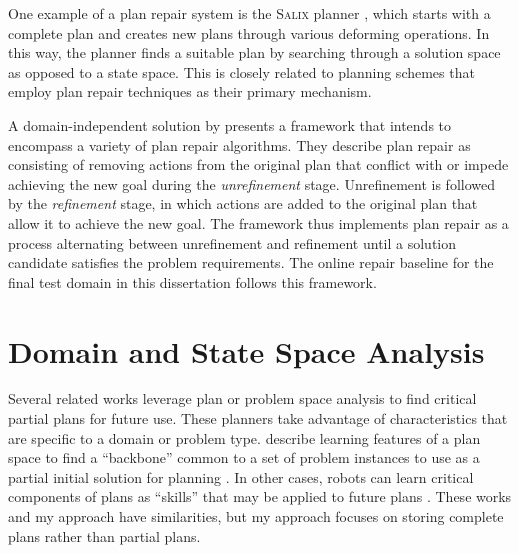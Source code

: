 One example of a plan repair system is the \textsc{Salix} planner \citep{logan97routeplanning}, which starts with a complete plan and creates new plans through various deforming operations.  In this way, the planner finds a suitable plan by searching through a solution space as opposed to a state space.  This is closely related to planning schemes that employ plan repair techniques as their primary mechanism.




A domain-independent solution by \cite{krogt05planrepair} presents a framework that intends to encompass a variety of plan repair algorithms.  They describe plan repair as consisting of removing actions from the original plan that conflict with or impede achieving the new goal during the \textit{unrefinement} stage.  Unrefinement is followed by the \textit{refinement} stage, in which actions are added to the original plan that allow it to achieve the new goal. The framework thus implements plan repair as a process alternating between  unrefinement and refinement until a  solution candidate satisfies the problem requirements.  The online repair baseline for the final test domain in this dissertation follows this framework.



\section{Domain and State Space Analysis}
\label{sec:state-space-analysis}

Several related works leverage plan or problem space analysis to find critical partial plans for future use. These planners take advantage of characteristics that are specific to a domain or problem type.  \citeauthor{bulka08useful}  describe learning features of a plan space to find a ``backbone'' common to a set of problem instances to use as a partial initial solution for planning \citep{bulka06analyzing,bulka08useful}.  In other cases, robots can learn critical components of plans as ``skills'' that may be applied to future plans \citep{konidaris08autonomous,konidaris08sensorimotor}.  These works and my approach have similarities, but my approach focuses on storing complete plans rather than partial plans.

